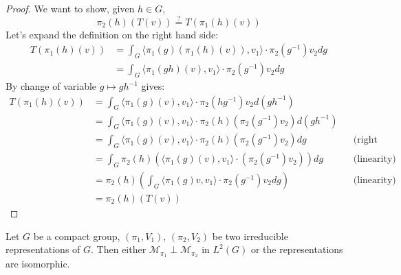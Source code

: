 \begin{proof}
  We want to show, given $h \in G$,
  \[
    \pi_2(h)(T(v)) \stackrel{?}{=} T(\pi_1(h)(v))
  \]
  Let's expand the definition on the right hand side:
  \begin{align*}
    T(\pi_1(h)(v)) & = \int_G \langle \pi_1(g)(\pi_1(h)(v)),v_1 \rangle \cdot \pi_2(g^{-1}) v_2 dg\\
                   & = \int_G \langle \pi_1(gh)(v),v_1 \rangle \cdot \pi_2(g^{-1}) v_2 dg
  \end{align*}
  By change of variable $g \mapsto gh^{-1}$ gives:
  \begin{align*}
    T(\pi_1(h)(v)) & = \int_G \langle \pi_1(g)(v),v_1 \rangle \cdot \pi_2(hg^{-1}) v_2 d(gh^{-1})\\
                   & = \int_G \langle \pi_1(g)(v),v_1 \rangle \cdot \pi_2(h)(\pi_2(g^{-1}) v_2) d(gh^{-1})\\
                   & = \int_G \langle \pi_1(g)(v),v_1 \rangle \cdot \pi_2(h)(\pi_2(g^{-1}) v_2) dg && \text{(right invariance)}\\
                   & = \int_G  \pi_2(h) (\langle \pi_1(g)(v),v_1 \rangle \cdot (\pi_2(g^{-1}) v_2)) dg && \text{(linearity)}\\
                   & = \pi_2(h)(\int_G \langle \pi_1(g)v , v_1  \rangle \cdot \pi_2(g^{-1}) v_2 dg) && \text{(linearity)}\\
                   & = \pi_2(h)(T(v))
  \end{align*}
\end{proof}

\begin{thm} \label{schur-ortho-1}
  Let $G$ be a compact group, $(\pi_1, V_1)$, $(\pi_2, V_2)$ be two irreducible
  representations of $G$.  Then either $\mathcal{M}_{\pi_1} \perp
  \mathcal{M}_{\pi_2}$ in $L^2(G)$ or the representations are isomorphic.
\end{thm}

